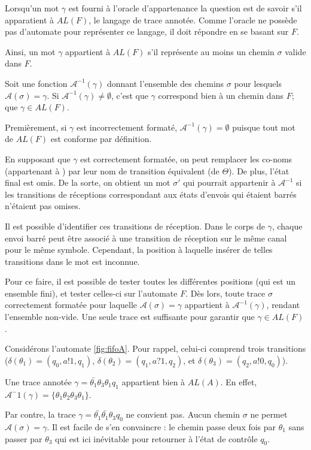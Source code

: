 Lorsqu'un mot $\gamma$ est fourni à l'oracle d'appartenance la question est de savoir s'il apparatient à $AL(F)$, le langage de trace annotée. Comme l'oracle ne possède pas d'automate pour représenter ce langage, il doit répondre en se basant sur $F$.

Ainsi, un mot $\gamma$ appartient à $AL(F)$ s'il représente au moins un chemin $\sigma$ valide dans $F$.

Soit une fonction $\mathcal{A}^{-1}(\gamma)$ donnant l'ensemble des chemins $\sigma$ pour lesquels $\mathcal{A}(\sigma)=\gamma$. Si $\mathcal{A}^{-1}(\gamma)\neq\emptyset$, c'est que $\gamma$ correspond bien à un chemin dans $F$; que $\gamma\in AL(F)$.

Premièrement, si $\gamma$ est incorrectement formaté, $\mathcal{A}^{-1}(\gamma)=\emptyset$ puisque tout mot de $AL(F)$ est conforme par définition.

En supposant que $\gamma$ est correctement formatée, on peut remplacer les co-noms (appartenant à \barTheta) par leur nom de transition équivalent (de $\Theta$). De plus, l'état final est omis. De la sorte, on obtient un mot $\sigma'$ qui pourrait appartenir à $\mathcal{A}^{-1}$ si les transitions de réceptions correspondant aux états d'envois qui étaient barrés n'étaient pas omises.

Il est possible d'identifier ces transitions de réception. Dans le corps de $\gamma$, chaque envoi barré peut être associé à une transition de réception sur le même canal pour le même symbole. Cependant, la position à laquelle insérer de telles transitions dans le mot est inconnue.

Pour ce faire, il est possible de tester toutes les différentes positions (qui est un ensemble fini), et tester celles-ci sur l'automate $F$. Dès lors, toute trace $\sigma$ correctement formatée pour laquelle $\mathcal{A}(\sigma)=\gamma$ appartient à $\mathcal{A}^{-1}(\gamma)$, rendant l'ensemble non-vide. Une seule trace est suffisante pour garantir que $\gamma\in AL(F)$.

\begin{example}
Considérons l'automate \ref{fig:fifoA}. Pour rappel, celui-ci comprend trois transitions ($\delta(\theta_1)=(q_0, a!1, q_1)$, $\delta(\theta_2)=(q_1,a?1,q_2)$, et $\delta(\theta_3)=(q_2, a!0, q_0)$).

Une trace annotée $\gamma=\bar{\theta_1}\theta_3\theta_1q_1$ appartient bien à $AL(A)$. En effet, $\mathcal{A}^-1(\gamma)=\{\theta_1\theta_2\theta_3\theta_1\}$.

Par contre, la trace $\gamma=\bar{\theta_1}\bar{\theta_1}\theta_3q_0$ ne convient pas. Aucun chemin $\sigma$ ne permet $\mathcal{A}(\sigma)=\gamma$. Il est facile de s'en convaincre : le chemin passe deux fois par $\theta_1$ sans passer par $\theta_3$ qui est ici inévitable pour retourner à l'état de contrôle $q_0$.
\end{example}

